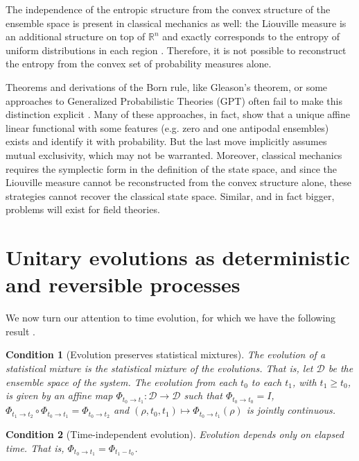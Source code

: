 \documentclass[entropy,article,submit,moreauthors]{Definitions/mdpi}
\newtheorem{condth}{Condition}
\renewcommand*{\thecondth}{\Roman{condth}}
\newenvironment{condition}[2][]{\renewcommand{\thecondth}{#2}\begin{condth}[#1]\label{#2}}{\end{condth}\renewcommand{\thecondth}{\Roman{condth}}}
\begin{document}
The independence of the entropic structure from the convex structure of the ensemble space is present in classical mechanics as well: the Liouville measure is an additional structure on top of $\mathbb{R}^n$ and exactly corresponds to the entropy of uniform distributions in each region \cite{David2015,Ochs1976}. Therefore, it is not possible to reconstruct the entropy from the convex set of probability measures alone.

Theorems and derivations of the Born rule, like Gleason's theorem, or some approaches to Generalized Probabilistic Theories (GPT) often fail to make this distinction explicit \cite{Gleason1957,Plavala2023}. Many of these approaches, in fact, show that a unique affine linear functional with some features (e.g. zero and one antipodal ensembles) exists and identify it with probability. But the last move implicitly assumes mutual exclusivity, which may not be warranted. Moreover, classical mechanics requires the symplectic form in the definition of the state space, and since the Liouville measure cannot be reconstructed from the convex structure alone, these strategies cannot recover the classical state space. Similar, and in fact bigger, problems will exist for field theories.

\section{Unitary evolutions as deterministic and reversible processes}

We now turn our attention to time evolution, for which we have the following result \cite{Carcassi2026SchroedingerCharacterizations,Carcassi2026UnitaryEntropy}.
\begin{condition}[Evolution preserves statistical mixtures]{[B]EVMIX}
	The evolution of a statistical mixture is the statistical mixture of the evolutions. That is, let $\mathcal{D}$ be the ensemble space of the system. The evolution from each $t_0$ to each $t_1$, with $t_1\geq t_0$, is given by an affine map $\Phi_{t_0 \to t_1}:\mathcal{D}\to \mathcal{D}$ such that $\Phi_{t_0 \to t_0}=I$, $\Phi_{t_1 \to t_2}\circ \Phi_{t_0 \to t_1}=\Phi_{t_0 \to t_2}$ and $(\rho,t_0,t_1)\mapsto \Phi_{t_0 \to t_1}(\rho)$ is jointly continuous.
\end{condition}

\begin{condition}[Time-independent evolution]{EVTI}
	Evolution depends only on elapsed time. That is, $\Phi_{t_0 \to t_1}=\Phi_{t_1-t_0}$.
\end{condition}
\end{document}
